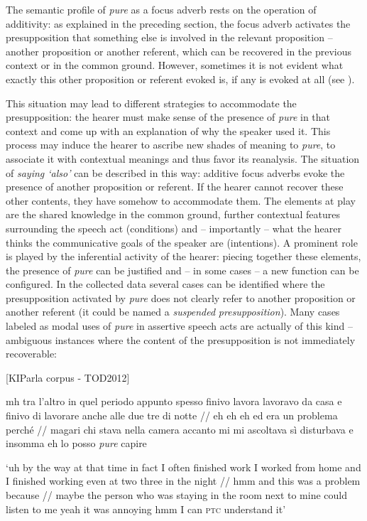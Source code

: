 The semantic profile of \textit{pure} as a focus adverb rests on the operation of additivity: as explained in the preceding section, the focus adverb activates the presupposition that something else is involved in the relevant proposition – another proposition or another referent, which can be recovered in the previous context or in the common ground. However, sometimes it is not evident what exactly this other proposition or referent evoked is, if any is evoked at all (see \citealt{SchwenterWaltereit2010}).

This situation may lead to different strategies to accommodate the presupposition: the hearer must make sense of the presence of \textit{pure} in that context and come up with an explanation of why the speaker used it. This process may induce the hearer to ascribe new shades of meaning to \textit{pure}, to associate it with contextual meanings and thus favor its reanalysis. The situation of \textit{saying ‘also’} can be described in this way: additive focus adverbs evoke the presence of another proposition or referent. If the hearer cannot recover these other contents, they have somehow to accommodate them. The elements at play are the shared knowledge in the common ground, further contextual features surrounding the speech act (conditions) and – importantly – what the hearer thinks the communicative goals of the speaker are (intentions). A prominent role is played by the inferential activity of the hearer: piecing together these elements, the presence of \textit{pure} can be justified and – in some cases – a new function can be configured. In the collected data several cases can be identified where the presupposition activated by \textit{pure} does not clearly refer to another proposition or another referent (it could be named a \textit{suspended} \textit{presupposition}). Many cases labeled as modal uses of \textit{pure} in assertive speech acts are actually of this kind – ambiguous instances where the content of the presupposition is not immediately recoverable:

\ea%
    \label{ex:key:45}

          [KIParla corpus - TOD2012]

mh tra l’altro in quel periodo appunto spesso finivo lavora lavoravo da casa e finivo di lavorare anche alle due tre di notte // eh eh eh ed era un problema perché // magari chi stava nella camera accanto mi mi ascoltava sì disturbava e insomma eh lo posso \textit{pure} capire

\glt ‘uh by the way at that time in fact I often finished work I worked from home and I finished working even at two three in the night // hmm and this was a problem because // maybe the person who was staying in the room next to mine could listen to me yeah it was annoying hmm I can \textsc{ptc} understand it’
    \z

